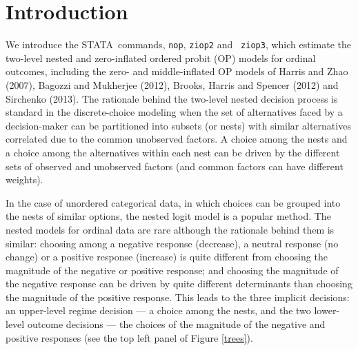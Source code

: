 \documentclass[letterpaper,fleqn,12pt]{article}
\begin{document}
\section{Introduction}

We introduce the STATA\ commands, \texttt{nop}, \texttt{ziop2} and \texttt{%
ziop3}, which estimate the two-level nested and zero-inflated ordered probit
(OP) models for ordinal outcomes, including the zero- and middle-inflated OP
models of Harris and Zhao (2007), Bagozzi and Mukherjee (2012), Brooks,
Harris and Spencer (2012) and Sirchenko (2013). The rationale behind the
two-level nested decision process is standard in the discrete-choice
modeling when the set of alternatives faced by a decision-maker can be
partitioned into subsets (or nests) with similar alternatives correlated due
to the common unobserved factors. A choice among the nests and a choice
among the alternatives within each nest can be driven by the different sets
of observed and unobserved factors (and common factors can have different
weights).

In the case of unordered categorical data, in which choices can be grouped
into the nests of similar options, the nested logit model is a popular
method. The nested models for ordinal data are rare although the rationale
behind them is similar: choosing among a negative response (decrease), a
neutral response (no change) or a positive response (increase) is quite
different from choosing the magnitude of the negative or positive response;
and choosing the magnitude of the negative response can be driven by quite
different determinants than choosing the magnitude of the positive response.
This leads to the three implicit decisions: an upper-level regime decision
--- a choice among the nests, and the two lower-level outcome decisions ---
the choices of the magnitude of the negative and positive responses (see the
top left panel of Figure \ref{trees}).

\medskip \medskip
\end{document}
